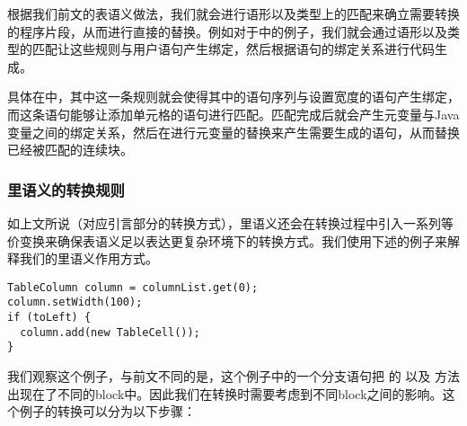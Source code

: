 根据我们前文的表语义做法，我们就会进行语形以及类型上的匹配来确立需要转换的程序片段，从而进行直接的替换。例如对于中的例子，我们就会通过语形以及类型的匹配让这些规则与用户语句产生绑定，然后根据语句的绑定关系进行代码生成。

具体在中，其中这一条规则就会使得其中的语句序列与设置宽度的语句产生绑定，而这条语句能够让添加单元格的语句进行匹配。匹配完成后就会产生元变量与Java变量之间的绑定关系，然后在进行元变量的替换来产生需要生成的语句，从而替换已经被匹配的连续块。

\subsubsection{里语义的转换规则}
如上文所说（对应引言部分的转换方式），里语义还会在转换过程中引入一系列等价变换来确保表语义足以表达更复杂环境下的转换方式。我们使用下述的例子来解释我们的里语义作用方式。

\begin{center}
\begin{smpage}{0.5\columnwidth}
\begin{lstlisting}[style=java]
TableColumn column = columnList.get(0);
column.setWidth(100);
if (toLeft) {
  column.add(new TableCell());
} 
\end{lstlisting}
\end{smpage}
\end{center}

我们观察这个例子，与前文不同的是，这个例子中的一个分支语句把  的  以及  方法出现在了不同的block中。因此我们在转换时需要考虑到不同block之间的影响。这个例子的转换可以分为以下步骤：

